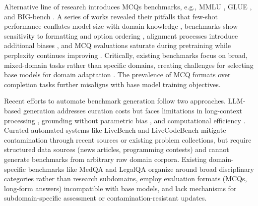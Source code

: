 \documentclass[10pt]{article}
\begin{document}
Alternative line of research introduces MCQs benchmarks, e.g., MMLU \citep{hendrycks2020measuring}, GLUE \citep{wang2018glue}, and BIG-bench \citep{srivastava2022beyond}. 
A series of works revealed their pitfalls that few-shot performance conflates model size with domain knowledge \citep{brown2020language}, benchmarks show sensitivity to formatting and option ordering \citep{alzahrani2024benchmarks, gupta2024changing}, alignment processes introduce additional biases \citep{bai2022training}, and MCQ evaluations saturate during pretraining while perplexity continues improving \citep{olmo20242}. Critically, existing benchmarks focus on broad, mixed-domain tasks rather than specific domains, creating challenges for selecting base models for domain adaptation \citep{han2023medalpaca, cui2025mirtarbase, nguyen2023astrollama}. The prevalence of MCQ formats over completion tasks \citep{chang2024survey} further misaligns with base model training objectives.


Recent efforts to automate benchmark generation follow two approaches. LLM-based generation \citep{perez2023discovering, yuan2025llm} addresses curation costs but faces limitations in long-context processing \citep{li2024long}, grounding without parametric bias \citep{monea2023glitch}, and computational efficiency \citep{chavan2024faster}. Curated automated systems like LiveBench \citep{white2024livebench} and LiveCodeBench \citep{jain2024livecodebench} mitigate contamination through recent sources or existing problem collections, but require structured data sources (news articles, programming contests) and cannot generate benchmarks from arbitrary raw domain corpora. Existing domain-specific benchmarks like MedQA \citep{jin2021disease} and LegalQA \citep{louis2024interpretable} organize around broad disciplinary categories rather than research subdomains, employ evaluation formats (MCQs, long-form answers) incompatible with base models, and lack mechanisms for subdomain-specific assessment or contamination-resistant updates.
\end{document}
